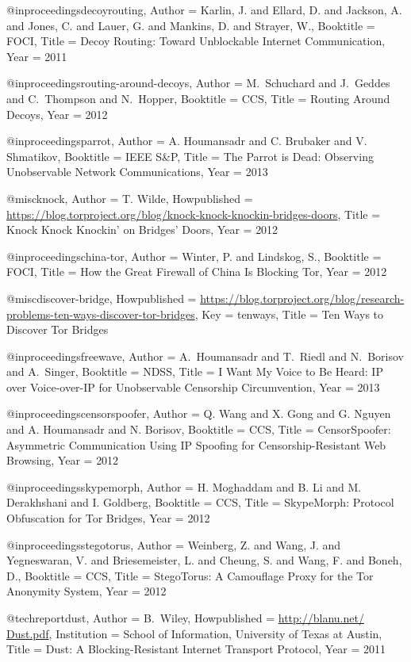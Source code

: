 {{@inproceedings{decoyrouting,
	Author = {Karlin, J. and Ellard, D. and Jackson, A. and Jones, C. and Lauer, G. and Mankins, D. and Strayer, W.},
	Booktitle = {{FOCI}},
	Title = {{Decoy Routing: Toward Unblockable Internet Communication}},
	Year = {2011}}

@inproceedings{routing-around-decoys,
	Author = {M.~Schuchard and J.~Geddes and C.~Thompson and N.~Hopper},
	Booktitle = {{CCS}},
	Title = {{Routing Around Decoys}},
	Year = {2012}}

@inproceedings{parrot,
	Author = {A. Houmansadr and C. Brubaker and V. Shmatikov},
	Booktitle = {IEEE S\&P},
	Title = {{The Parrot is Dead: Observing Unobservable Network Communications}},
	Year = {2013}}

@misc{knock,
	Author = {T. Wilde},
	Howpublished = {\url{https://blog.torproject.org/blog/knock-knock-knockin-bridges-doors}},
	Title = {{Knock Knock Knockin' on Bridges' Doors}},
	Year = {2012}}

@inproceedings{china-tor,
	Author = {Winter, P. and Lindskog, S.},
	Booktitle = {{FOCI}},
	Title = {{How the Great Firewall of China Is Blocking Tor}},
	Year = {2012}}

@misc{discover-bridge,
	Howpublished = {\url{https://blog.torproject.org/blog/research-problems-ten-ways-discover-tor-bridges}},
	Key = {tenways},
	Title = {{Ten Ways to Discover Tor Bridges}}}

@inproceedings{freewave,
	Author = {A.~Houmansadr and T.~Riedl and N.~Borisov and A.~Singer},
	Booktitle = {{NDSS}},
	Title = {{I Want My Voice to Be Heard: IP over Voice-over-IP for Unobservable Censorship Circumvention}},
	Year = 2013}

@inproceedings{censorspoofer,
	Author = {Q. Wang and X. Gong and G. Nguyen and A. Houmansadr and N. Borisov},
	Booktitle = {CCS},
	Title = {{CensorSpoofer: Asymmetric Communication Using IP Spoofing for Censorship-Resistant Web Browsing}},
	Year = {2012}}

@inproceedings{skypemorph,
	Author = {H. Moghaddam and B. Li and M. Derakhshani and I. Goldberg},
	Booktitle = {CCS},
	Title = {{SkypeMorph: Protocol Obfuscation for Tor Bridges}},
	Year = {2012}}

@inproceedings{stegotorus,
	Author = {Weinberg, Z. and Wang, J. and Yegneswaran, V. and Briesemeister, L. and Cheung, S. and Wang, F. and Boneh, D.},
	Booktitle = {CCS},
	Title = {{StegoTorus: A Camouflage Proxy for the Tor Anonymity System}},
	Year = {2012}}

@techreport{dust,
	Author = {{B.~Wiley}},
	Howpublished = {\url{http://blanu.net/ Dust.pdf}},
	Institution = {School of Information, University of Texas at Austin},
	Title = {{Dust: A Blocking-Resistant Internet Transport Protocol}},
	Year = {2011}}

}}
